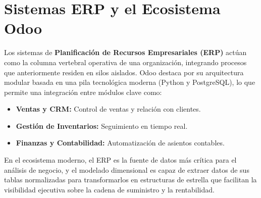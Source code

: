 \section{Sistemas ERP y el Ecosistema Odoo}

Los sistemas de \textbf{Planificación de Recursos Empresariales (ERP)} actúan como la columna vertebral operativa de una organización, integrando procesos que anteriormente residen en silos aislados. Odoo destaca por su arquitectura modular basada en una pila tecnológica moderna (Python y PostgreSQL), lo que permite una integración entre módulos clave como:
\newpage
\begin{itemize}
    \item \textbf{Ventas y CRM:} Control de ventas y relación con clientes.
    \item \textbf{Gestión de Inventarios:} Seguimiento en tiempo real.
    \item \textbf{Finanzas y Contabilidad:} Automatización de asientos contables.
\end{itemize}

En el ecosistema moderno, el ERP es la fuente de datos más crítica para el análisis de negocio, y el modelado dimensional es capaz de extraer datos de sus tablas normalizadas para transformarlos en estructuras de estrella que facilitan la visibilidad ejecutiva sobre la cadena de suministro y la rentabilidad.
